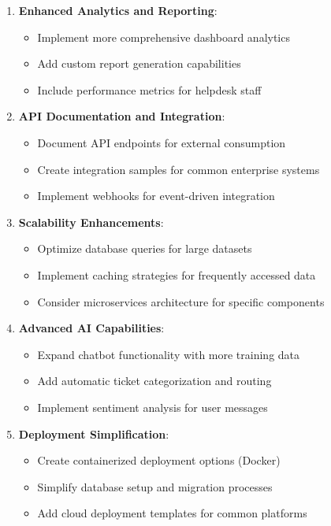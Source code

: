 \documentclass[12pt,a4paper]{article}
\begin{document}
\begin{enumerate}
    \item \textbf{Enhanced Analytics and Reporting}:
    \begin{itemize}
        \item Implement more comprehensive dashboard analytics
        \item Add custom report generation capabilities
        \item Include performance metrics for helpdesk staff
    \end{itemize}
    
    \item \textbf{API Documentation and Integration}:
    \begin{itemize}
        \item Document API endpoints for external consumption
        \item Create integration samples for common enterprise systems
        \item Implement webhooks for event-driven integration
    \end{itemize}
    
    \item \textbf{Scalability Enhancements}:
    \begin{itemize}
        \item Optimize database queries for large datasets
        \item Implement caching strategies for frequently accessed data
        \item Consider microservices architecture for specific components
    \end{itemize}
    
    \item \textbf{Advanced AI Capabilities}:
    \begin{itemize}
        \item Expand chatbot functionality with more training data
        \item Add automatic ticket categorization and routing
        \item Implement sentiment analysis for user messages
    \end{itemize}
    
    \item \textbf{Deployment Simplification}:
    \begin{itemize}
        \item Create containerized deployment options (Docker)
        \item Simplify database setup and migration processes
        \item Add cloud deployment templates for common platforms
    \end{itemize}
\end{enumerate}
\end{document}

